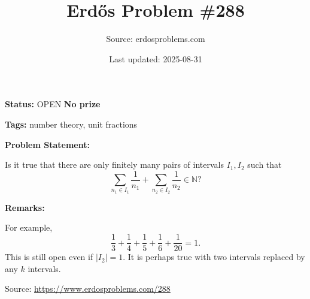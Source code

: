 \documentclass{article}
\title{Erd\H{o}s Problem \#288}
\date{Last updated: 2025-08-31}
\author{Source: erdosproblems.com}
\begin{document}
\maketitle

\noindent\textbf{Status:} OPEN \quad \textbf{No prize}

\noindent\textbf{Tags:} number theory, unit fractions

\medskip
\noindent\textbf{Problem Statement:}

Is it true that there are only finitely many pairs of intervals $I_1,I_2$ such that\[\sum_{n_1\in I_1}\frac{1}{n_1}+\sum_{n_2\in I_2}\frac{1}{n_2}\in \mathbb{N}?\]

\bigskip
\noindent\textbf{Remarks:}

For example,\[\frac{1}{3}+\frac{1}{4}+\frac{1}{5}+\frac{1}{6}+\frac{1}{20}=1.\]This is still open even if $\lvert I_2\rvert=1$. It is perhaps true with two intervals replaced by any $k$ intervals.

\bigskip
\noindent\small{Source: \url{https://www.erdosproblems.com/288}}
\end{document}
